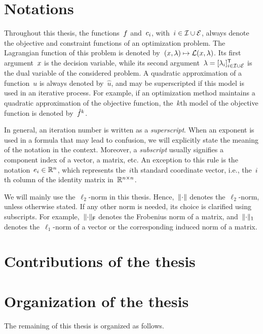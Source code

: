 \section{Notations}

Throughout this thesis, the functions~$f$ and~$c_{i}$, with~$i \in \mathcal{I} \cup \mathcal{E}$, always denote the objective and constraint functions of an optimization problem.
The Lagrangian function of this problem is denoted by~$(\iter, \lm) \mapsto \lag(\iter, \lm)$.
Its first argument~$\iter$ is the decision variable, while its second argument~$\lm = [\lm_i]_{i \in \iub \cup \ieq}^{\T}$ is the dual variable of the considered problem.
A quadratic approximation of a function~$u$ is always denoted by~$\hat{u}$, and may be superscripted if this model is used in an iterative process.
For example, if an optimization method maintains a quadratic approximation of the objective function, the~$k$th model of the objective function is denoted by~$\objm[k]$.

In general, an iteration number is written as a \emph{superscript}.
When an exponent is used in a formula that may lead to confusion, we will explicitly state the meaning of the notation in the context.
Moreover, a \emph{subscript} usually signifies a component index of a vector, a matrix, etc.
An exception to this rule is the notation~$e_i \in \mathbb{R}^n$, which represents the~$i$th standard coordinate vector, i.e., the~$i$th column of the identity matrix in~$\mathbb{R}^{n \times n}$.

We will mainly use the~$\ell_2$-norm in this thesis.
Hence,~$\lVert\cdot\rVert$ denotes the~$\ell_2$-norm, unless otherwise stated.
If any other norm is needed, its choice is clarified using subscripts.
For example,~$\lVert\cdot\rVert_{\mathsf{F}}$ denotes the Frobenius norm of a matrix, and~$\lVert\cdot\rVert_1$ denotes the~$\ell_1$-norm of a vector or the corresponding induced norm of a matrix.

\section{Contributions of the thesis}


\section{Organization of the thesis}

The remaining of this thesis is organized as follows.

